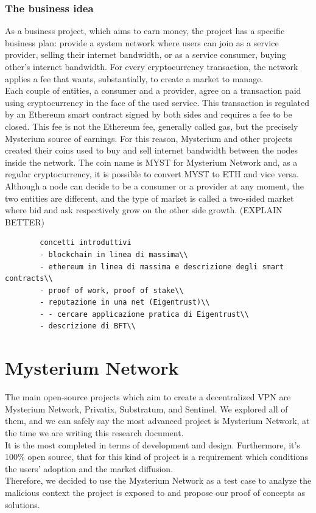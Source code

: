 \documentclass[]{article}
\begin{document}
	\subsubsection{The business idea}
	As a business project, which aims to earn money, the project has a specific business plan: provide a system network where users can join as a service provider, selling their internet bandwidth, or as a service consumer, buying other's internet bandwidth. For every cryptocurrency transaction, the network applies a fee that wants, substantially, to create a market to manage.\\
	Each couple of entities, a consumer and a provider, agree on a transaction paid using cryptocurrency in the face of the used service. This transaction is regulated by an Ethereum smart contract signed by both sides and requires a fee to be closed. This fee is not the Ethereum fee, generally called gas, but the precisely Mysterium source of earnings. For this reason, Mysterium and other projects created their coins used to buy and sell internet bandwidth between the nodes inside the network. The coin name is MYST for Mysterium Network and, as a regular cryptocurrency, it is possible to convert MYST to ETH and vice versa.\\
	Although a node can decide to be a consumer or a provider at any moment, the two entities are different, and the type of market is called a two-sided market where bid and ask respectively grow on the other side growth. (EXPLAIN BETTER)\\

	\begin{verbatim}
		concetti introduttivi
		- blockchain in linea di massima\\
		- ethereum in linea di massima e descrizione degli smart contracts\\
		- proof of work, proof of stake\\
		- reputazione in una net (Eigentrust)\\
		- - cercare applicazione pratica di Eigentrust\\
		- descrizione di BFT\\
	\end{verbatim}
	
	\section{Mysterium Network}
	
	The main open-source projects which aim to create a decentralized VPN are Mysterium Network, Privatix, Substratum, and Sentinel. We explored all of them, and we can safely say the most advanced project is Mysterium Network, at the time we are writing this research document.\\It is the most completed in terms of development and design. Furthermore, it's 100\% open source, that for this kind of project is a requirement which conditions the users' adoption and the market diffusion.\\
	Therefore, we decided to use the Mysterium Network as a test case to analyze the malicious context the project is exposed to and propose our proof of concepts as solutions.
	
\end{document}
